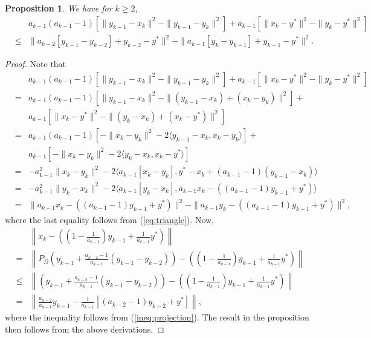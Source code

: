 \documentclass[11pt]{article}
\newtheorem{proposition}[thm]{Proposition}
\begin{document}
\begin{proposition}\label{prop:technical}
We have for $k \geq 2$, 
\begin{eqnarray}
& & a_{k-1}(a_{k-1}-1)[\| y_{k-1} - {x}_{k} \|^2 - \| y_{k-1} - y_{k} \|^2] + a_{k-1}[\| {x}_{k} - y^\ast \|^2 - \| y_{k} - y^\ast \|^2] \nonumber \\
& \leq & \|a_{k-2}[ y_{k-1} - y_{k-2}]  + y_{k-2} - y^\ast \|^2 - \| a_{k-1}[ y_{k} - y_{k-1}]  + y_{k-1} - y^\ast \|^2.  \label{ineq:technical}
\end{eqnarray}
\end{proposition}
\begin{proof}
Note that
\begin{eqnarray*}
& & a_{k-1}(a_{k-1}-1)[\| y_{k-1} - {x}_{k} \|^2 - \| y_{k-1} - y_{k} \|^2] + a_{k-1}[\| {x}_{k} - y^\ast \|^2 - \| y_{k} - y^\ast \|^2] \\
& = &  a_{k-1}(a_{k-1}-1)[\| y_{k-1} - {x}_{k} \|^2 - \| (y_{k-1} - {x}_{k}) + ({x}_{k} - y_{k}) \|^2] + \\
&  & a_{k-1}[\| {x}_{k} - y^\ast \|^2 - \| (y_{k} - {x}_{k}) + ({x}_{k} - y^\ast) \|^2] \\
& = & a_{k-1}(a_{k-1}-1)[- \| {x}_{k} - y_{k} \|^2 - 2 \langle y_{k-1} - {x}_{k}, {x}_{k} - y_{k} \rangle] + \\
& &  a_{k-1}[-\| {x}_{k} - y_{k}\|^2 - 2\langle y_{k} - {x}_{k}, {x}_{k} - y^\ast \rangle] \\
& = & - a_{k-1}^2 \| {x}_{k} - y_{k} \|^2 - 2\langle a_{k-1}[{x}_{k} - y_{k}], y^\ast - {x}_{k} + (a_{k-1} - 1)(y_{k-1} - {x}_{k}) \rangle \\
& = & - a_{k-1}^2 \| y_{k} - {x}_{k} \|^2 -2 \langle a_{k-1}[y_{k} - {x}_{k}], a_{k-1} {x}_{k} - ((a_{k-1}-1)y_{k-1}+y^\ast) \rangle \\
& = & \| a_{k-1}{x}_{k} -  ((a_{k-1}-1)y_{k-1}+y^\ast) \|^2 - \| a_{k-1} y_{k} - ((a_{k-1}-1)y_{k-1} + y^\ast) \|^2,
 \end{eqnarray*}
 where the last equality follows from (\ref{eq:triangle}).  Now,
 \begin{eqnarray*}
& &  \left\| {x}_{k} - \left( \left(1 - \frac{1}{a_{k-1}}\right)y_{k-1} + \frac{1}{a_{k-1}}y^\ast \right) \right\| \\
& = & \left\| P_\Omega \left( y_{k-1} + \frac{a_{k-2} - 1}{a_{k-1}} (y_{k-1} - y_{k-2}) \right) - \left( \left(1 - \frac{1}{a_{k-1}}\right)y_{k-1} + \frac{1}{a_{k-1}}y^\ast \right) \right\| \\
& \leq & \left\|  \left( y_{k-1} + \frac{a_{k-2} - 1}{a_{k-1}} (y_{k-1} - y_{k-2}) \right) - \left( \left(1 - \frac{1}{a_{k-1}}\right)y_{k-1} + \frac{1}{a_{k-1}}y^\ast \right) \right\| \\
& = & \left\| \frac{a_{k-2}}{a_{k-1}}y_{k-1} - \frac{1}{a_{k-1}}[(a_{k-2}-1)y_{k-2} + y^\ast] \right\|,
 \end{eqnarray*} 
where the inequality follows from (\ref{ineq:projection}).  The result in the proposition then follows from the above derivations.
\end{proof}
\end{document}

